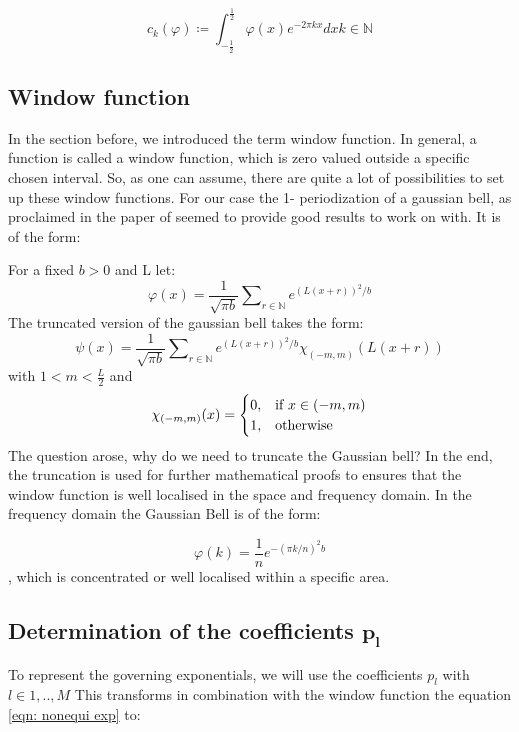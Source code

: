 \documentclass[11pt]{report} %
\begin{document}
\begin{equation}
c_{k} (\varphi) \coloneqq \int_{-\frac{1}{2}}^{\frac{1}{2}} \varphi (x) e^{-2 \pi kx} dx         
k \in \mathbb{N}
\end{equation}

\subsection{Window function}
In the section before, we introduced the term window function.
In general, a function is called a window function, which is zero valued outside a specific chosen interval.
So, as one can assume, there are quite a lot of possibilities to set up these window functions.
For our case the 1- periodization of a gaussian bell, as proclaimed in the paper of \cite{Peter2011} seemed to provide good results to work on with.
It is of the form: 

For a fixed $b>0$ and L let:
\begin{equation}
\varphi(x)= \frac{1}{\sqrt{\pi b}} \sum\nolimits_{r \in \mathbb{N}}  e^{(L(x+r))^2/b}
\end{equation}
The truncated version of the gaussian bell takes the form: 
\begin{equation}
\psi(x)= \frac{1}{\sqrt{\pi b}} \sum\nolimits_{r \in \mathbb{N}}  e^{(L(x+r))^2/b}\chi_{(-m,m)}(L(x+r))
\end{equation}
with $1<m < \frac{L}{2}$ and
\begin{equation}
    \chi_{(-m,m)}(x)=
    \begin{cases}
      0, & \text{if}\ x\in (-m,m) \\
      1, & \text{otherwise}
    \end{cases}\notag
\end{equation} 
The question arose, why do we need to truncate the Gaussian bell? 
In the end, the truncation is used for further mathematical proofs to ensures that the window function is well localised in the space and frequency domain. 
In the frequency domain the Gaussian Bell is of the form: 

\begin{equation}
\varphi(k)=\frac{1}{n}e^{-(\pi k/n)^2b}
\end{equation}, 
which is concentrated or well localised within a specific area. 

\subsection{Determination of the coefficients $\bm{p_l}$}
To represent the governing exponentials, we will use the coefficients $p_l$ with $l \in{1,..,M}$    
This transforms in combination with the window function the equation \eqref{eqn: nonequi exp} to: 
\end{document}
